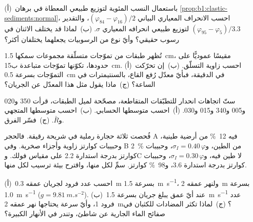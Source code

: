 \begin{exercise}[$\star\star$]\label{exo:b1:clastic-sediments:5}
(أ)~باستعمال النسب المئوية لتوزيع طبيعي المعطاة في برهان \cref{prop:b1:clastic-sediments:normal}، احسب الانحراف المعياري البياني $(\varphi_{84} - \varphi_{16})/2$، والتقدير $(\varphi_{95} - \varphi_5)/3.3$ لتوزيع طبيعي انحرافه المعياري $\sigma$. (ب)~لماذا قد يختلف الاثنان في رسوب حقيقي؟ وأيّ نوع من الرسوبيات يجعلهما يختلفان أكثر؟
\end{exercise}

\begin{exercise}[$\star\star$]\label{exo:b1:clastic-sediments:6}
تُظهر طبقات من تموّجات متسلّقة مجموعات سمكها \qty{1.5}{cm}، مقيسًا عموديًّا على حدودها، تكوّنها تموّجات متباعدة ب\qty{15}{cm}. (أ)~احسب زاوية التسلّق. (ب)~إن تحرّكت التموّجات بسرعة \qty{0.5}{cm} في الدقيقة، فبأيّ معدّل رُفع القاع، بالسنتيمترات في الساعة؟ (ج)~ماذا يقول مثل هذا المعدّل عن الجريان؟
\end{exercise}

\begin{exercise}[$\star\star$]\label{exo:b1:clastic-sediments:7}
ستّ اتجاهات انحدار للتطبّقات المتقاطعة، مصحّحة لميل الطبقات، قرأت 350 و\num{020} و\num{005} و\num{340} و\num{015} و\num{030}. (أ)~احسب متوسطها الحسابي. (ب)~احسب متوسطها المتجهي و$\bar R$. (ج)~فسّر الفرق.
\end{exercise}

\begin{exercise}[$\star\star$]\label{exo:b1:clastic-sediments:8}
فُحصت ثلاثة حجارة رملية في شريحة رقيقة. فالحجر A فيه \qty{12}{\percent} من أرضية طينية، وحبيبات كوارتز زاوية  وأجزاء صخرية. وفي B \qty{2}{\percent} من الطين، و$\sigma_I = 0.40\,\varphi$، وحبيبات كوارتز بدرجة استدارة \num{2.2} على مقياس فولك. وC لا طين فيه، و$\sigma_I =
0.30\,\varphi$، وحبيبات كوارتز بدرجة استدارة \num{3.6}، و\qty{98}{\percent} كوارتز. سمِّ  لكل منها، واقترح بيئة ترسيب لكل منها.
\end{exercise}

\begin{exercise}[$\star\star$]\label{exo:b1:clastic-sediments:9}
(أ)~احسب عدد فرود لجريان عمقه \qty{0.3}{m} بسرعة \qty{1.5}{m.s^{-1}}، ولنهر عمقه \qty{2}{m} بسرعة \qty{1.0}{m.s^{-1}} ($g
= \qty{9.81}{m.s^{-2}}$). (ب)~عند أيّ عمق يبلغ جريان بسرعة \qty{1.5}{m.s^{-1}} عدد فرود 1، وأيّ سرعة يحتاجها نهر عمقه \qty{2}{m}؟ (ج)~لماذا تكثر المضادات للكثبان في صفائح الماء الجارية عن شاطئ، وتندر في الأنهار الكبيرة؟
\end{exercise}

